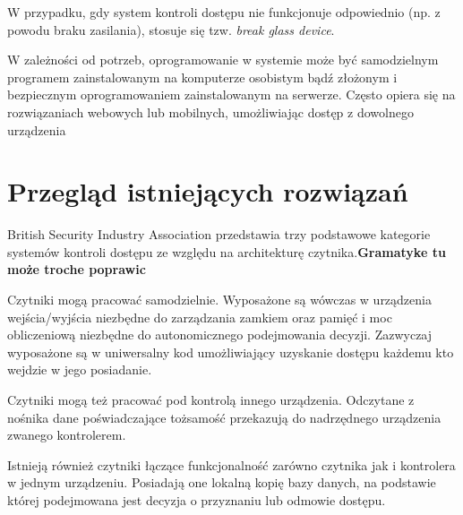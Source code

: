 		W przypadku, gdy system kontroli dostępu nie funkcjonuje odpowiednio (np. z powodu braku zasilania), stosuje się tzw. \textit{break glass device}.

		W zależności od potrzeb, oprogramowanie w systemie może być samodzielnym programem zainstalowanym na komputerze osobistym bądź złożonym i bezpiecznym oprogramowaniem zainstalowanym na serwerze. Często opiera się na rozwiązaniach webowych lub mobilnych, umożliwiając dostęp z dowolnego urządzenia

	\section{Przegląd istniejących rozwiązań}
		British Security Industry Association przedstawia trzy podstawowe kategorie systemów kontroli dostępu ze względu na architekturę czytnika.\textbf{Gramatyke tu może troche poprawic}

		Czytniki mogą pracować samodzielnie. Wyposażone są wówczas w urządzenia wejścia/wyjścia niezbędne do zarządzania zamkiem oraz pamięć i moc obliczeniową niezbędne do autonomicznego podejmowania decyzji. Zazwyczaj wyposażone są w uniwersalny kod umożliwiający uzyskanie dostępu każdemu kto wejdzie w jego posiadanie.

		Czytniki mogą też pracować pod kontrolą innego urządzenia. Odczytane z nośnika dane poświadczające tożsamość przekazują do nadrzędnego urządzenia zwanego kontrolerem.

		Istnieją również czytniki łączące funkcjonalność zarówno czytnika jak i kontrolera w jednym urządzeniu. Posiadają one lokalną kopię bazy danych, na podstawie której podejmowana jest decyzja o przyznaniu lub odmowie dostępu.

